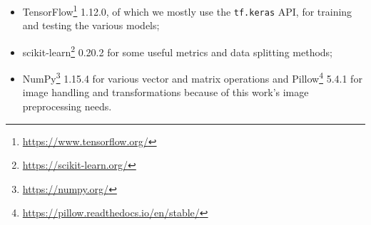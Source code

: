 \begin{itemize}
    \item TensorFlow\footnote{\url{https://www.tensorflow.org/}} 1.12.0, of which we mostly use the \verb|tf.keras| API, for training and testing the various models;
    \item scikit-learn\footnote{\url{https://scikit-learn.org/}} 0.20.2 for some useful metrics and data splitting methods;
    \item NumPy\footnote{\url{https://numpy.org/}} 1.15.4 for various vector and matrix operations and Pillow\footnote{\url{https://pillow.readthedocs.io/en/stable/}} 5.4.1 for image handling and transformations because of this work's image preprocessing needs.
\end{itemize}

